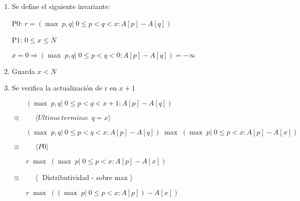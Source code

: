 \documentclass[hidelinks]{article}
\begin{document}
\begin{enumerate}
	\item Se define el siguiente invariante: \par
	      \begin{center}
		      P0: $r =(\max \; p,q| \; 0 \leq p < q < x : A[p] - A[q])$ \par
		      P1: $0 \leq x \leq N$ \par
		      $x=0 \Rightarrow (\max \; p,q| \; 0 \leq p < q < 0 : A[p] - A[q])=- \infty$ \par
	      \end{center}
	\item Guarda $x<N$
	\item Se verifica la actualización de r en $x+1$ \par
	      $ \qquad (\max \; p,q| \; 0 \leq p < q < x+1 : A[p] - A[q])$ \par
	      $\equiv  \qquad \langle Ultimo \; termino: \; q = x \rangle$ \par
	      $ \qquad (\max \; p,q| \; 0 \leq p < q < x : A[p] - A[q]) \; \max \; (\max \; p| \; 0 \leq p < x : A[p] - A[x])$ \par
	      $\equiv  \qquad \langle P0 \rangle$ \par
	      $ \qquad r \; \max \; (\max \; p| \; 0 \leq p < x : A[p] - A[x])$ \par
	      $\equiv  \qquad \langle  \;$ Distributividad - sobre max $\rangle$ \par
	      $ \qquad r \; \max \; ((\max \; p| \; 0 \leq p < x : A[p]) - A[x])$ \par


\end{enumerate}
\end{document}
